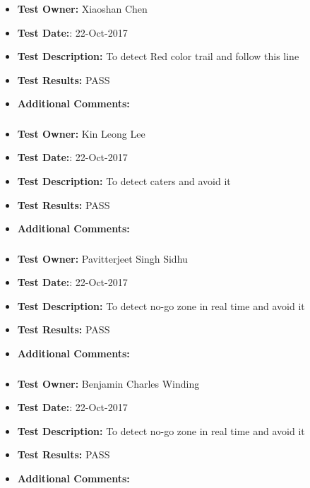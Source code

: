 \documentclass[10pt,a4paper,titlepage]{article}
\begin{document}
\subsubsection*{}
\begin{itemize}
	\item \textbf{Test Owner:}  Xiaoshan Chen
	\item \textbf{Test Date:}: 22-Oct-2017
	\item \textbf{Test Description:} To detect Red color trail and follow this line
	\item \textbf{Test Results:} PASS
	\item \textbf{Additional Comments:}	
\end{itemize}

\subsubsection*{}
\begin{itemize}
	\item \textbf{Test Owner:}  Kin Leong Lee
	\item \textbf{Test Date:}: 22-Oct-2017
	\item \textbf{Test Description:} To detect caters and avoid it
	\item \textbf{Test Results:} PASS
	\item \textbf{Additional Comments:}
\end{itemize}

\subsubsection*{}
\begin{itemize}
	\item \textbf{Test Owner:}  Pavitterjeet Singh Sidhu
	\item \textbf{Test Date:}: 22-Oct-2017
	\item \textbf{Test Description:} To detect no-go zone in real time and avoid it
	\item \textbf{Test Results:} PASS
	\item \textbf{Additional Comments:}	
\end{itemize}

\subsubsection*{}
\begin{itemize}
	\item \textbf{Test Owner:} Benjamin Charles Winding
	\item \textbf{Test Date:}: 22-Oct-2017
	\item \textbf{Test Description:} To detect no-go zone in real time and avoid it
	\item \textbf{Test Results:} PASS
	\item \textbf{Additional Comments:}
\end{itemize}
\end{document}
